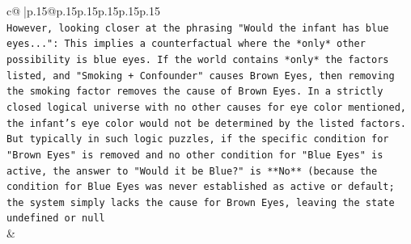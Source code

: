 \documentclass{article}
\begin{document}
{\begin{supertabular}{c@{$\;$}|p{.15\linewidth}@{}p{.15\linewidth}p{.15\linewidth}p{.15\linewidth}p{.15\linewidth}p{.15\linewidth}}
{{{\\ 
\texttt{However, looking closer at the phrasing "Would the infant has blue eyes...": This implies a counterfactual where the *only* other possibility is blue eyes. If the world contains *only* the factors listed, and "Smoking + Confounder" causes Brown Eyes, then removing the smoking factor removes the cause of Brown Eyes. In a strictly closed logical universe with no other causes for eye color mentioned, the infant's eye color would not be determined by the listed factors. But typically in such logic puzzles, if the specific condition for "Brown Eyes" is removed and no other condition for "Blue Eyes" is active, the answer to "Would it be Blue?" is **No** (because the condition for Blue Eyes was never established as active or default; the system simply lacks the cause for Brown Eyes, leaving the state undefined or null} \\
            }
        }
    }
    & \\ \\


\end{supertabular}}
\end{document}
